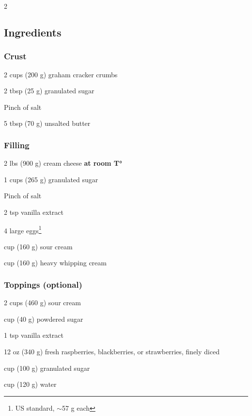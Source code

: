\newpage
{}

\begin{multicols}{2}
	\subsection*{Ingredients}
	
	\subsubsection*{Crust}
	\begin{ingredients}
		\item 2 cups (200 g) graham cracker crumbs
		\item 2 tbsp (25 g) granulated sugar
		\item Pinch of salt
		\item 5 tbsp (70 g) unsalted butter
	\end{ingredients}
	
	\subsubsection*{Filling}
	\begin{ingredients}
		\item 2 lbs (900 g) cream cheese \textbf{at room T°}
		\item 1 cups (265 g) granulated sugar
		\item Pinch of salt
		\item 2 tsp vanilla extract
		\item 4 large eggs\footnote{US standard, $\sim$57 g each}
		\item {} cup (160 g) sour cream
		\item {} cup (160 g) heavy whipping cream
	\end{ingredients}
	
	\subsubsection*{Toppings \normalfont(optional)}
	\begin{ingredients}
	\item 2 cups (460 g) sour cream
	\item {} cup (40 g) powdered sugar
	\item 1 tsp vanilla extract
	\item 12 oz (340 g) fresh raspberries, blackberries, or strawberries, finely diced
	\item {} cup (100 g) granulated sugar
	\item {} cup (120 g) water
	\end{ingredients}


\end{multicols}
